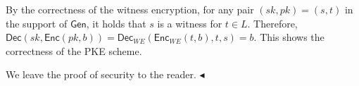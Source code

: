 By the correctness of the witness encryption, for any pair $(sk,pk)=(s,t)$ in the support of ${\mathsf{Gen}}$, it holds that $s$ is a witness for $t\in L$. Therefore, ${\mathsf{Dec}}(sk,{\mathsf{Enc}}(pk,b))={\mathsf{Dec}}_{WE}({\mathsf{Enc}}_{WE}(t,b),t,s)=b$. This shows the correctness of the PKE scheme.\par




We leave the proof of security to the reader.
$\blacktriangleleft$
\par



